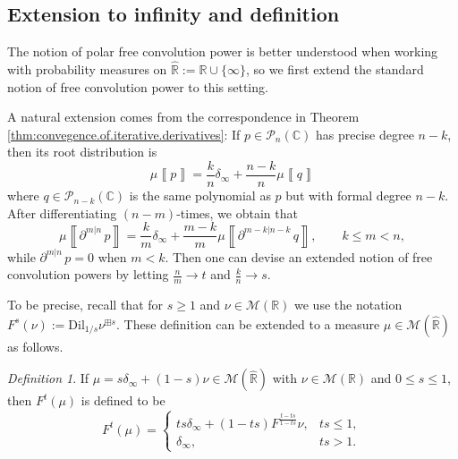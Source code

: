 \documentclass[reqno,11pt]{amsart}
\theoremstyle{remark}
\newtheorem{definition}[theorem]{Definition}
\newcommand{\cc}{\mathbb{C}}
\newcommand{\rr}{\mathbb{R}}
\newcommand{\MM}{\mathcal{M}}
\newcommand{\dil}[1]{\mbox{Dil}_{#1}}
\newcommand{\diff}[2]{\partial^{#1|#2}\, }  %
\newcommand{\freepower}[1]{F^{#1}}
\newcommand{\meas}[1]{\mu \left\llbracket #1 \right\rrbracket}
\newcommand{\pol}{\mathcal{P}}
\begin{document}
\subsection{Extension to infinity and definition}
The notion of polar free convolution power is better understood when working with probability measures on 
$\hat{\rr}:=\rr\cup\{\infty\}$, so we first extend the standard notion of free convolution power to this setting. 

A natural extension comes from the correspondence in Theorem \ref{thm:convegence.of.iterative.derivatives}: If $ p\in \pol_n(\cc) $ has precise degree $n-k$, then its root distribution is $$ \meas{p} = \frac{k}{n}\delta_\infty + \frac{n-k}{n}\meas{q} $$
where $q\in \pol_{n-k}(\cc)$ is the same polynomial as $p$ but with formal degree $ n-k $. After differentiating $(n-m)$-times, we obtain that
\[  \meas{\diff{m}{n}p} =
    \frac{k}{m}\delta_\infty + \frac{m-k}{m}\meas{\diff{m-k}{n-k}q},\quad \quad k\leq m<n, \]
while $ \diff{m}{n}p = 0 $ when $ m<k $.  Then one can devise an extended notion of free convolution powers by letting $ \frac{n}{m}\to t $ and $ \frac{k}{n} \to s $. 

To be precise, recall that for $s\geq 1$ and $\nu\in \MM(\rr)$ we use the notation
$\freepower{s}(\nu):= \dil{1/s}\nu^{\boxplus s}$. These definition can be extended to a measure $\mu \in \MM(\hat{\rr}) $ as follows.


\begin{definition}\label{def: extended free convolution power}
    If $ \mu = s\delta_\infty + (1-s)\nu \in \MM(\hat{\rr}) $ with $ \nu \in \MM(\rr) $ and $ 0\leq s\leq 1 $, then $ \freepower{t}(\mu) $ is defined to be
\begin{equation}
\label{eq:freepower.gen.infty}
    \freepower{t}(\mu) = \begin{cases}
        ts\delta_\infty + (1-ts)\freepower{\frac{t-ts}{1-ts}}\nu,& ts\leq1,\\
        \delta_\infty, & ts> 1.
    \end{cases}
\end{equation}
\end{definition}
\end{document}
